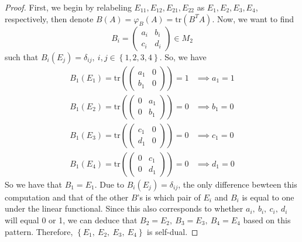 \documentclass{article}
\newcommand{\parens}[1]{\left(#1\right)}
\newcommand{\bracks}[1]{\left\{#1\right\}}
\newcommand{\tr}[1]{\text{tr}\parens{#1}}
\begin{document}
    \begin{proof}
    First, we begin by relabeling $E_{11}, E_{12}, E_{21}, E_{22}$ as 
    $E_{1}, E_{2}, E_{3}, E_{4}$, respectively, then denote 
    $B(A) = \varphi_B(A) = \tr{B^T A}$. Now, we want to 
    find 
    $$B_i = \parens{\begin{matrix}
    a_i & b_i \\
    c_i & d_i    
    \end{matrix}} \in M_2$$
    such that $B_i(E_j) = \delta_{ij},\ i,j \in \bracks{1,2,3,4}$. So, we 
    have
    \begin{align*}
    B_1(E_1) = \tr{\parens{\begin{matrix}
    a_1 & 0 \\ b_1 & 0
    \end{matrix}}} = 1 &\implies a_1 = 1 \\
    B_1(E_2) = \tr{\parens{\begin{matrix}
    0 & a_1 \\ 0 & b_1
    \end{matrix}}} = 0 &\implies b_1 = 0 \\
    B_1(E_3) = \tr{\parens{\begin{matrix}
    c_1 & 0 \\ d_1 & 0
    \end{matrix}}} = 0 &\implies c_1 = 0 \\
    B_1(E_4) = \tr{\parens{\begin{matrix}
    0 & c_1 \\ 0 & d_1
    \end{matrix}}} = 0 &\implies d_1 = 0
    \end{align*}
    So we have that $B_1 = E_1$. Due to $B_i(E_j) = \delta_{ij}$, the only 
    difference bewteen this computation and that of the other $B$'s is
    which pair of $E_i$ and $B_i$ is equal to one under the linear 
    functional. Since this also corresponds to whether $a_i,\ b_i,\ c_i,\ 
    d_i$ will equal 0 or 1, we can deduce that $B_2 = E_2,\ 
    B_3 = E_3,\ B_4 = E_4$ based on this pattern. Therefore, $\bracks{E_1,\ 
    E_2,\ E_3,\ E_4}$ is self-dual.
    \end{proof}
\end{document}
